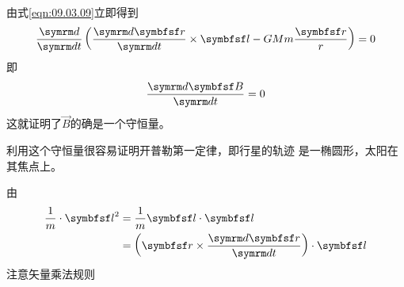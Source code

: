 由式\eqref{eqn:09.03.09}立即得到
\begin{equation*}
  \frac { \dif } { \dif t } \left( \frac { \dif \vec{r} } { \dif t } \times \vec{l} - G M m \frac { \vec{r} } { r } \right) = 0
\end{equation*}
即
\begin{equation}\label{eqn:09.03.10}
  \frac { \dif \vec{B} } { \dif t } = 0
\end{equation}
这就证明了$\vec{B}$的确是一个守恒量。

利用这个守恒量很容易证明开普勒第一定律，即行星的轨迹
是一椭圆形，太阳在其焦点上。

\noindent 由
\begin{equation*}
  \begin{split}
    \frac { 1 } { m } \cdot \vec{l} ^ { 2 } &= \frac { 1 } { m } \vec{l} \cdot \vec{l} \\
    &= \left( \vec{r} \times \frac { \dif \vec{r} } { \dif t } \right) \cdot \vec{l}
  \end{split}
\end{equation*}
注意矢量乘法规则

